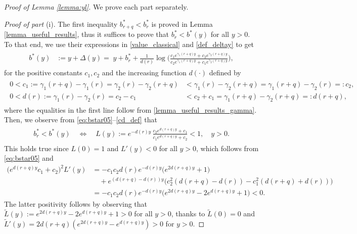 \documentclass[11pt]{article} %
\numberwithin{komcounter}{section}
\numberwithin{equation}{section}
\numberwithin{theorem}{section}
\begin{document}
\begin{proof}[Proof of Lemma \ref{lemma:yl}]
We prove each part separately. 

\vspace{1mm}
{\it Proof of part} (i).
The first inequality $b^*_{r+q} < b^*_r$ is proved in Lemma \ref{lemma_useful_results}, thus it suffices to prove that $b^*_r < b^*(y)$ for all $y > 0$. 
To that end, we use their expressions in \eqref{value_classical} and \eqref{def_deltay} to get  
\begin{align}\label{eq:bstar05}
\begin{split}    
b^*(y) &:= y +\Delta(y) 
= \; y + b^*_r + \frac{1}{d(r)} \log\Big( \frac{c_1 e^{\gamma_1(r+q)y} + c_2 e^{\gamma_2(r+q)y}}{c_2 e^{\gamma_1(r+q)y} + c_1 e^{\gamma_2(r+q)y}} \Big),
\end{split}    
\end{align}
for the positive constants $c_1, c_2$ and the increasing function $d(\cdot)$ defined by 
\begin{align}\label{cd_def}
\begin{split}
0 < c_1 := \gamma_1(r+q) - \gamma_1(r) = \gamma_2(r) - \gamma_2(r + q) &< \gamma_1(r) - \gamma_2(r+q) = \gamma_1(r+q) - \gamma_2(r) =: c_2,\\
0 < d(r) := \gamma_1(r) - \gamma_2(r) = c_2 - c_1 &< c_2 + c_1 = \gamma_1(r+q) - \gamma_2(r+q) =: d(r+q),
\end{split}
\end{align}
where the equalities in the first line follow from \eqref{lemma_useful_results_gamma}.
Then, we observe from \eqref{eq:bstar05}--\eqref{cd_def} that
\begin{align*}
\begin{split}
b^*_r < b^*(y)
\quad \Leftrightarrow \quad 
L(y) := e^{- d(r) y} \, \frac{c_2 e^{d(r+q)y} + c_1}{c_1 e^{d(r+q)y} + c_2} < 1 ,
\quad y>0 .
\end{split}    
\end{align*}
This holds true since $L(0)=1$ and $L'(y)<0$ for all $y>0$, which follows from \eqref{eq:bstar05} and 
\begin{align*}
\big(e^{d(r+q)y}c_1 + c_2 \big)^2 L'(y) 
&= - c_1 c_2 d(r) e^{-d(r)y} \big(e^{2d(r+q)y} + 1 \big) \\ 
&\quad + e^{(d(r+q)-d(r))y} \big(c_2^2 (d(r+q)-d(r)) -c_1^2 (d(r+q)+d(r)) \big) \\
&= -c_1 c_2 d(r) e^{-d(r)y} \big(e^{2d(r+q)y} - 2e^{d(r+q)y} + 1 \big) < 0.
\end{align*}
The latter positivity follows by observing that $\widetilde L(y):=e^{2d(r+q)y} - 2e^{d(r+q)y} + 1 > 0$ for all $y>0$, thanks to $\widetilde L(0)=0$ and $\widetilde L'(y) = 2d(r+q)\left(e^{2d(r+q)y} -e^{d(r+q)y}\right) > 0$ for $y > 0$.


\end{proof}
\end{document}
